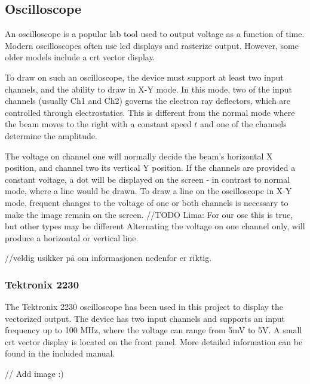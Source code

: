 \subsection{Oscilloscope}
An oscilloscope is a popular lab tool used to output voltage as a function of time.
Modern oscilloscopes often use \gls{lcd} displays and rasterize output. 
However, some older models include a \gls{crt} vector display.

To draw on such an oscilloscope, the device must support at least two input channels, and the ability to draw in X-Y mode.
In this mode, two of the input channels (usually Ch1 and Ch2) governs the electron ray deflectors, which are controlled through electrostatics. 
This is different from the normal mode where the beam moves to the right with a constant speed \( t \) and one of the channels determine the amplitude.

The voltage on channel one will normally decide the beam's horizontal X position, and channel two its vertical Y position.
If the channels are provided a constant voltage, a dot will be displayed on the screen - in contrast to normal mode, where a line would be drawn.
To draw a line on the oscilloscope in X-Y mode, frequent changes to the voltage of one or both channels is necessary to make the image remain on the screen. //TODO Lima: For our osc this is true, but other types may be different
Alternating the voltage on one channel only, will produce a horizontal or vertical line.

//veldig usikker på om informasjonen nedenfor er riktig.

\subsubsection{Tektronix 2230}
The Tektronix 2230 oscilloscope has been used in this project to display the vectorized output.
The device has two input channels and supports an input frequency up to 100 MHz, where the voltage can range from 5mV to 5V.
A small \gls{crt} vector display is located on the front panel.
More detailed information can be found in the included manual\cite{tektronix2230}.

// Add image :)


